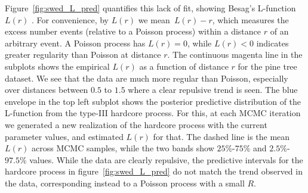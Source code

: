 \documentclass{statsoc}
\begin{document}
  Figure~\ref{fig:swed_L_pred} quantifies this lack of fit, %
  showing Besag's L-function $L(r)$ \citep{Besag77}.
  For convenience, by $L(r)$ we mean~${L(r) - r}$, which measures the excess number events (relative to a Poisson process) within 
  a distance $r$ of an arbitrary event. A Poisson process has ${L(r) = 0}$, while
  ${L(r) < 0}$ indicates greater regularity than Poisson at distance $r$. 
The continuous magenta line in the subplots shows the empirical $L(r)$ as a function of distance $r$ for the 
  pine tree dataset. 
  We see that the data are much more regular than Poisson, especially over distances between $0.5$ to $1.5$ where a clear repulsive trend is seen.
  The blue envelope in the top left subplot shows the posterior predictive distribution of the L-function 
  from the type-III hardcore process. For this, at each MCMC iteration we generated a new realization of the hardcore process with the 
  current parameter values, and estimated $L(r)$ for that. The dashed line is the mean $L(r)$ across MCMC samples, while the two bands show $25\%$-$75\%$ and
  $2.5\%$-$97.5\%$ values. %
  While the data are clearly repulsive, the predictive intervals for the hardcore process in figure~\ref{fig:swed_L_pred} do not match the trend observed in the data, 
  corresponding instead to a Poisson process with a small $R$. %
\end{document}
